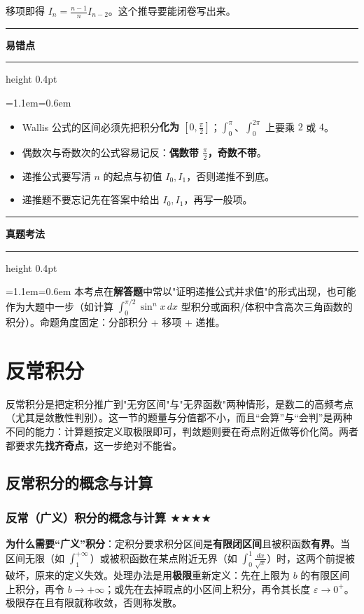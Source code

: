 \documentclass[11pt,openany,UTF8]{ctexbook}
\newcommand{\callouthead}[2]{%
  \par\addvspace{7pt}\noindent
  {\color{#1}\rule[-0.15em]{3pt}{1.05em}}\hspace{0.5em}%
  {\bfseries\color{#1}#2}\par\nobreak\vspace{-0.35em}%
  {\color{rulesep}\hrule height 0.4pt}\nobreak\vspace{0.45em}%
  \begingroup\small\setlength{\parindent}{0pt}%
  \leftskip=1.1em\rightskip=0.6em\noindent\ignorespaces}
\newcommand{\calloutend}{\par\endgroup\addvspace{7pt}}
\newenvironment{callwarn}[1]{\callouthead{warnbar}{#1}}{\calloutend}
\newenvironment{callexam}[1]{\callouthead{exambar}{#1}}{\calloutend}
\begin{document}
移项即得 $I_n=\frac{n-1}{n}I_{n-2}$。这个推导要能闭卷写出来。

\begin{callwarn}{易错点}
\begin{itemize}
\item Wallis 公式的区间必须先把积分\textbf{化为 $[0,\frac{\pi}{2}]$}；$\int_0^{\pi}$、$\int_0^{2\pi}$ 上要乘 $2$ 或 $4$。
\item 偶数次与奇数次的公式容易记反：\textbf{偶数带 $\frac{\pi}{2}$，奇数不带}。
\item 递推公式要写清 $n$ 的起点与初值 $I_0,I_1$，否则递推不到底。
\item 递推题不要忘记先在答案中给出 $I_0,I_1$，再写一般项。
\end{itemize}
\end{callwarn}

\begin{callexam}{真题考法}
本考点在\textbf{解答题}中常以"证明递推公式并求值"的形式出现，也可能作为大题中一步（如计算 $\int_0^{\pi/2}\sin^nx\,dx$ 型积分或面积/体积中含高次三角函数的积分）。命题角度固定：分部积分 + 移项 + 递推。

\end{callexam}

\section{反常积分}

反常积分是把定积分推广到"无穷区间"与"无界函数"两种情形，是数二的高频考点（尤其是敛散性判别）。这一节的题量与分值都不小，而且“会算”与“会判”是两种不同的能力：计算题按定义取极限即可，判敛题则要在奇点附近做等价化简。两者都要求先\textbf{找齐奇点}，这一步绝对不能省。

\subsection{反常积分的概念与计算}

\subsubsection{反常（广义）积分的概念与计算 $\bigstar$$\bigstar$$\bigstar$$\bigstar$}

\textbf{为什么需要“广义”积分}：定积分要求积分区间是\textbf{有限闭区间}且被积函数\textbf{有界}。当区间无限（如 $\int_1^{+\infty}$）或被积函数在某点附近无界（如 $\int_0^1\frac{dx}{\sqrt{x}}$）时，这两个前提被破坏，原来的定义失效。处理办法是用\textbf{极限}重新定义：先在上限为 $b$ 的有限区间上积分，再令 $b\to+\infty$；或先在去掉瑕点的小区间上积分，再令其长度 $\varepsilon\to0^+$。极限存在且有限就称收敛，否则称发散。
\end{document}
